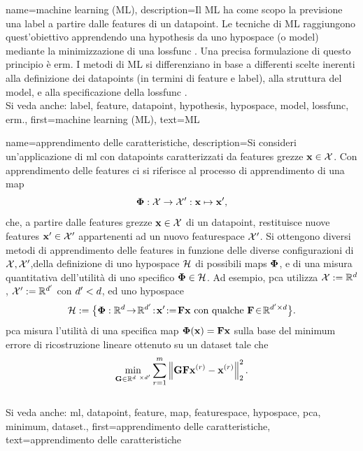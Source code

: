 {name={machine learning (ML)},
		 description={Il ML ha come scopo la previsione 
	 una \gls{label} a partire dalle \gls{feature}s di un \gls{datapoint}. Le tecniche di ML raggiungono 
	 quest'obiettivo apprendendo una \gls{hypothesis} da uno \gls{hypospace} (o \gls{model}) 
	 mediante la minimizzazione di una \gls{lossfunc} \cite{MLBasics,HastieWainwrightBook}. 
	 Una precisa formulazione di questo principio è \gls{erm}. I metodi di ML si differenziano in base
	 a differenti scelte inerenti alla definizione dei \gls{datapoint}s (in termini di \gls{feature} e \gls{label}), 
	 alla struttura del \gls{model}, e alla specificazione della \gls{lossfunc} \cite[Ch. 3]{MLBasics}.
	 	 			\\ 
		Si veda anche: \gls{label}, \gls{feature}, \gls{datapoint}, \gls{hypothesis}, \gls{hypospace}, \gls{model}, \gls{lossfunc}, 
		\gls{erm}.},
	first={machine learning (ML)},
	text={ML}
} 


{name={apprendimento delle caratteristiche},
	description={Si consideri un'applicazione di \gls{ml} con \glspl{datapoint} caratterizzati da 
		\glspl{feature} grezze ${\bf x} \in \mathcal{X}$. Con apprendimento delle \glspl{feature} 
		ci si riferisce al processo di apprendimento di una \gls{map} 
		$${\bf \Phi}: \mathcal{X} \rightarrow \mathcal{X}': {\bf x} \mapsto {\bf x}',$$ 
		che, a partire dalle \glspl{feature} grezze ${\bf x} \in \mathcal{X}$ di un \gls{datapoint}, restituisce nuove 
		\glspl{feature} ${\bf x}' \in \mathcal{X}'$ appartenenti ad un nuovo \gls{featurespace} $\mathcal{X}'$. 
		Si ottengono diversi metodi di apprendimento delle \glspl{feature} in funzione delle diverse configurazioni 
		di $\mathcal{X},\mathcal{X}'$,della definizione di uno \gls{hypospace} $\mathcal{H}$ 
		di possibili \glspl{map} ${\bf \Phi}$, e di una misura quantitativa dell’utilità di uno specifico
		 ${\bf \Phi} \in \mathcal{H}$. Ad esempio, \gls{pca} 
		utilizza $\mathcal{X} := \mathbb{R}^{d}$, $\mathcal{X}' := \mathbb{R}^{d'}$ 
		con $d' < d$, ed uno \gls{hypospace} 
		$$\hypospace\defeq \big\{ \featuremapvec: \mathbb{R}^{\dimlocalmodel}
		\!\rightarrow\! \mathbb{R}^{\dimlocalmodel'}\!:\!\featurevec'\!\defeq\!\mF \featurevec \mbox{ con qualche } \mF \!\in\! \mathbb{R}
		^{\dimlocalmodel' \times \dimlocalmodel} \big\}.$$ \Gls{pca} misura l'utilità di una specifica \gls{map} 
		${\bf \Phi}({\bf x})= \mathbf{F} {\bf x}$ 
	sulla base del \gls{minimum} errore di ricostruzione lineare ottenuto su un \gls{dataset} tale che 
$$ \min_{\mG \in \mathbb{R}^{\dimlocalmodel \times \dimlocalmodel'}} \sum_{\sampleidx=1}^{\samplesize} \normgeneric{\mG \mF \featurevec^{(\sampleidx)} - \featurevec^{(\sampleidx)}}{2}^{2}.$$ 
			\\ 
		Si veda anche: \gls{ml}, \gls{datapoint}, \gls{feature}, \gls{map}, \gls{featurespace}, \gls{hypospace}, \gls{pca}, \gls{minimum}, \gls{dataset}.}, 
	first={apprendimento delle caratteristiche},
	text={apprendimento delle caratteristiche}
} 

